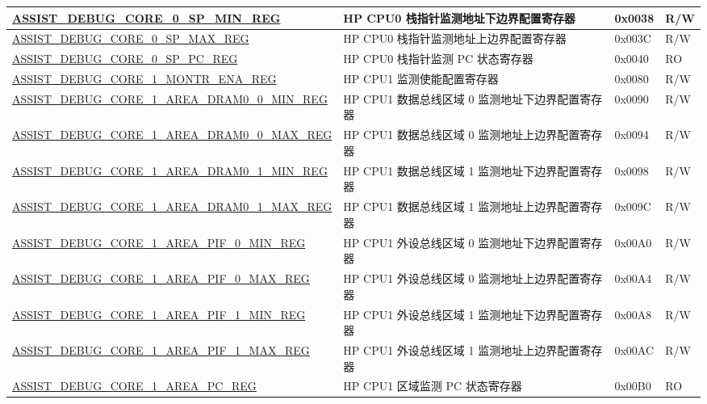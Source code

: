 \begin{longtable}{ | p{8.7cm} | m{5cm} | p{1.2cm} | p{0.75cm} | }
\hyperref[regdesc:ASSISTDEBUGCORE0SPMINREG]{ASSIST\_DEBUG\_CORE\_0\_SP\_MIN\_REG} & HP CPU0 栈指针监测地址下边界配置寄存器 & 0x0038 &R/W \\ \hline
\hyperref[regdesc:ASSISTDEBUGCORE0SPMAXREG]{ASSIST\_DEBUG\_CORE\_0\_SP\_MAX\_REG} & HP CPU0 栈指针监测地址上边界配置寄存器 & 0x003C &R/W \\ \hline
\hyperref[regdesc:ASSISTDEBUGCORE0SPPCREG]{ASSIST\_DEBUG\_CORE\_0\_SP\_PC\_REG} & HP CPU0 栈指针监测 PC 状态寄存器 & 0x0040 & RO \\ \hline
\hyperref[regdesc:ASSISTDEBUGCORE1MONTRENAREG]{ASSIST\_DEBUG\_CORE\_1\_MONTR\_ENA\_REG} & HP CPU1 监测使能配置寄存器 & 0x0080 & R/W \\ \hline
\hyperref[regdesc:ASSISTDEBUGCORE1AREADRAM00MINREG]{ASSIST\_DEBUG\_CORE\_1\_AREA\_DRAM0\_0\_MIN\_REG} & HP CPU1 数据总线区域 0 监测地址下边界配置寄存器 & 0x0090 & R/W \\ \hline
\hyperref[regdesc:ASSISTDEBUGCORE1AREADRAM00MAXREG]{ASSIST\_DEBUG\_CORE\_1\_AREA\_DRAM0\_0\_MAX\_REG} & HP CPU1 数据总线区域 0 监测地址上边界配置寄存器 & 0x0094 & R/W \\ \hline
\hyperref[regdesc:ASSISTDEBUGCORE1AREADRAM01MINREG]{ASSIST\_DEBUG\_CORE\_1\_AREA\_DRAM0\_1\_MIN\_REG} & HP CPU1 数据总线区域 1 监测地址下边界配置寄存器 & 0x0098 & R/W \\ \hline
\hyperref[regdesc:ASSISTDEBUGCORE1AREADRAM01MAXREG]{ASSIST\_DEBUG\_CORE\_1\_AREA\_DRAM0\_1\_MAX\_REG} & HP CPU1 数据总线区域 1 监测地址上边界配置寄存器 & 0x009C & R/W \\ \hline
\hyperref[regdesc:ASSISTDEBUGCORE1AREAPIF0MINREG]{ASSIST\_DEBUG\_CORE\_1\_AREA\_PIF\_0\_MIN\_REG} & HP CPU1 外设总线区域 0 监测地址下边界配置寄存器 & 0x00A0 & R/W \\ \hline
\hyperref[regdesc:ASSISTDEBUGCORE1AREAPIF0MAXREG]{ASSIST\_DEBUG\_CORE\_1\_AREA\_PIF\_0\_MAX\_REG} & HP CPU1 外设总线区域 0 监测地址上边界配置寄存器 & 0x00A4 & R/W \\ \hline
\hyperref[regdesc:ASSISTDEBUGCORE1AREAPIF1MINREG]{ASSIST\_DEBUG\_CORE\_1\_AREA\_PIF\_1\_MIN\_REG} & HP CPU1 外设总线区域 1 监测地址下边界配置寄存器 & 0x00A8 & R/W \\ \hline
\hyperref[regdesc:ASSISTDEBUGCORE1AREAPIF1MAXREG]{ASSIST\_DEBUG\_CORE\_1\_AREA\_PIF\_1\_MAX\_REG} & HP CPU1 外设总线区域 1 监测地址上边界配置寄存器 & 0x00AC & R/W \\ \hline
\hyperref[regdesc:ASSISTDEBUGCORE1AREAPCREG]{ASSIST\_DEBUG\_CORE\_1\_AREA\_PC\_REG} & HP CPU1 区域监测 PC 状态寄存器 & 0x00B0 & RO \\ \hline

\end{longtable}
